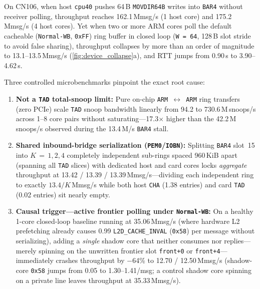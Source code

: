 On CN106, when host \texttt{cpu40} pushes 64\,B \texttt{MOVDIR64B} writes into \texttt{BAR4} without receiver polling, throughput reaches 162.1\,Mmsg/s (1 host core) and 175.2\,Mmsg/s (4 host cores). Yet when two or more ARM cores poll the default cacheable (\texttt{Normal-WB}, \texttt{0xFF}) ring buffer in closed loop (\texttt{W\,=\,64}, 128\,B slot stride to avoid false sharing), throughput collapses by more than an order of magnitude to 13.1--13.5\,Mmsg/s (\autoref{fig:device_collapse}a), and RTT jumps from 0.90\,\textmu s to 3.90--4.62\,\textmu s.

Three controlled microbenchmarks pinpoint the exact root cause:
\begin{enumerate}
  \item \textbf{Not a \texttt{TAD} total-snoop limit:} Pure on-chip \texttt{ARM\,$\leftrightarrow$\,ARM} ring transfers (zero PCIe) scale \texttt{TAD} snoop bandwidth linearly from 94.2 to 730.6\,M\,snoops/s across 1--8 core pairs without saturating---17.3$\times$ higher than the 42.2\,M\,snoops/s observed during the 13.4\,M/s \texttt{BAR4} stall.
  \item \textbf{Shared inbound-bridge serialization (\texttt{PEM0}/\texttt{IOBN}):} Splitting \texttt{BAR4} slot~15 into $K\,=\,1, 2, 4$ completely independent sub-rings spaced 960\,KiB apart (spanning all \texttt{TAD} slices) with dedicated host and card cores locks \emph{aggregate} throughput at 13.42 / 13.39 / 13.39\,Mmsg/s---dividing each independent ring to exactly $13.4 / K$\,Mmsg/s while both host \texttt{CHA} (1.38 entries) and card \texttt{TAD} (0.02 entries) sit nearly empty.
  \item \textbf{Causal trigger---active frontier polling under \texttt{Normal-WB}:} On a healthy 1-core closed-loop baseline running at 35.06\,Mmsg/s (where hardware L2 prefetching already causes 0.99 \texttt{L2D\_CACHE\_INVAL} (\texttt{0x58}) per message without serializing), adding a \emph{single} shadow core that neither consumes nor replies---merely spinning on the unwritten frontier slot \texttt{front+0} or \texttt{front+4}---immediately crashes throughput by $-$64\% to 12.70 / 12.50\,Mmsg/s (shadow-core \texttt{0x58} jumps from 0.05 to 1.30--1.41/msg; a control shadow core spinning on a private line leaves throughput at 35.33\,Mmsg/s).
\end{enumerate}

